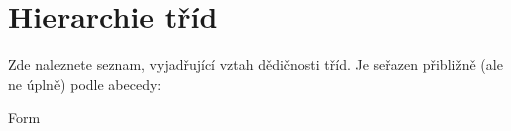 \section{Hierarchie tříd}
Zde naleznete seznam, vyjadřující vztah dědičnosti tříd. Je seřazen přibližně (ale ne úplně) podle abecedy\-:\begin{DoxyCompactList}
\item Form\begin{DoxyCompactList}
\item {}
\end{DoxyCompactList}
\end{DoxyCompactList}
